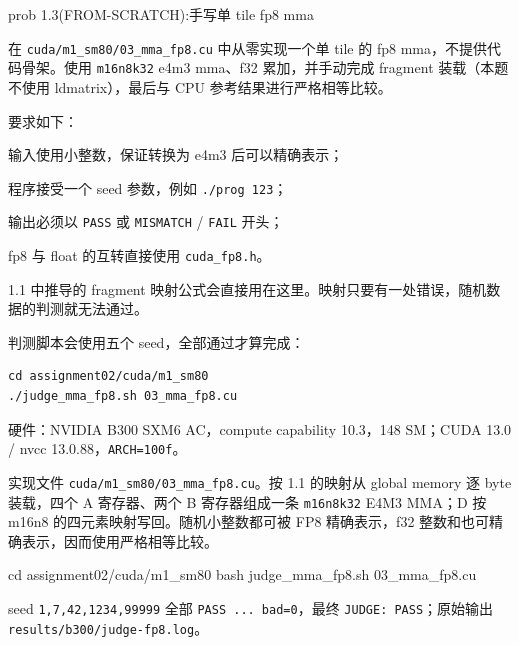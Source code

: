 \documentclass[11pt,a4paper,fontset=fandol]{ctexart}
\newenvironment{Shaded}{}{}
\newcommand{\BuiltInTok}[1]{\textcolor[rgb]{0.00,0.50,0.00}{#1}}
\newcommand{\FunctionTok}[1]{\textcolor[rgb]{0.02,0.16,0.49}{#1}}
\newcommand{\NormalTok}[1]{#1}
\begin{document}
\begin{capstone}{prob 1.3(FROM-SCRATCH):手写单 tile fp8 mma}

在
\texttt{cuda/\allowbreak{}m1\_\allowbreak{}sm80/\allowbreak{}03\_\allowbreak{}mma\_\allowbreak{}fp8.\allowbreak{}cu}
中从零实现一个单 tile 的 fp8 mma，不提供代码骨架。使用 \texttt{m16n8k32}
e4m3 mma、f32 累加，并手动完成 fragment 装载（本题不使用
ldmatrix），最后与 CPU 参考结果进行严格相等比较。

要求如下：

输入使用小整数，保证转换为 e4m3 后可以精确表示；

程序接受一个 seed 参数，例如
\texttt{.\allowbreak{}/\allowbreak{}prog\ 123}；

输出必须以 \texttt{PASS} 或 \texttt{MISMATCH} / \texttt{FAIL} 开头；

fp8 与 float 的互转直接使用
\texttt{cuda\_\allowbreak{}fp8.\allowbreak{}h}。

1.1 中推导的 fragment
映射公式会直接用在这里。映射只要有一处错误，随机数据的判测就无法通过。

判测脚本会使用五个 seed，全部通过才算完成：

\begin{verbatim}
cd assignment02/cuda/m1_sm80
./judge_mma_fp8.sh 03_mma_fp8.cu
\end{verbatim}

\end{capstone}

\begin{answer}

硬件：NVIDIA B300 SXM6 AC，compute capability 10.3，148 SM；CUDA 13.0 /
nvcc 13.0.88，\texttt{ARCH=\allowbreak{}100f}。

实现文件
\texttt{cuda/\allowbreak{}m1\_\allowbreak{}sm80/\allowbreak{}03\_\allowbreak{}mma\_\allowbreak{}fp8.\allowbreak{}cu}。按
1.1 的映射从 global memory 逐 byte 装载，四个 A 寄存器、两个 B
寄存器组成一条 \texttt{m16n8k32} E4M3 MMA；D 按 m16n8
的四元素映射写回。随机小整数都可被 FP8 精确表示，f32
整数和也可精确表示，因而使用严格相等比较。

\begin{Shaded}
\begin{Highlighting}[]
\BuiltInTok{cd}\NormalTok{ assignment02/cuda/m1\_sm80}
\FunctionTok{bash}\NormalTok{ judge\_mma\_fp8.sh 03\_mma\_fp8.cu}
\end{Highlighting}
\end{Shaded}

seed
\texttt{1,\allowbreak{}7,\allowbreak{}42,\allowbreak{}1234,\allowbreak{}99999}
全部
\texttt{PASS\ .\allowbreak{}.\allowbreak{}.\allowbreak{}\ bad=\allowbreak{}0}，最终
\texttt{JUDGE:\allowbreak{}\ PASS}；原始输出
\texttt{results/\allowbreak{}b300/\allowbreak{}judge-\allowbreak{}fp8.\allowbreak{}log}。

\end{answer}
\end{document}
